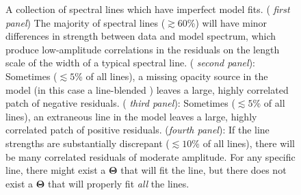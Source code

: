\documentclass[iop,floatfix]{emulateapj}
\newcommand{\vT}{ {\bm \Theta}}
\begin{document}
\begin{figure}[!htb]
\begin{center}
  \caption{A collection of spectral lines which have imperfect model fits.
    ( {\it first panel}) The majority of spectral lines ($\gtrsim 60$\%) will
    have minor differences in strength between data and model spectrum, which
    produce low-amplitude correlations in the residuals on the length scale of
    the width of a typical spectral line.  ( {\it second panel}): Sometimes
    ($\lesssim 5$\% of all lines), a missing opacity source in the model (in
    this case a line-blended ) leaves a large, highly correlated
    patch of negative residuals.  ( {\it third panel}): Sometimes ($\lesssim
    5$\% of all lines), an extraneous line in the model leaves a large, highly
    correlated patch of positive residuals. ({\it fourth panel}): If the line
    strengths are substantially discrepant ($\lesssim 10$\% of all lines),
    there will be many correlated residuals of moderate amplitude. For any specific line, there might
    exist a $\vT$ that will fit the line, but there does not exist a $\vT$ that
    will properly fit \emph{all} the lines.}
\label{fig:badlines}
\end{center}
\end{figure}



\end{document}
